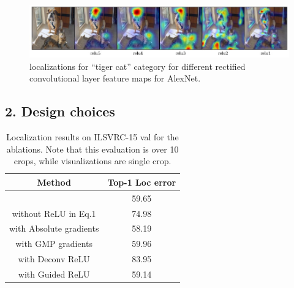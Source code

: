 \begin{figure}
 \centering
 \includegraphics[width=1\linewidth]{figures/alex_conv_layers_new.jpg}
 \caption{\gcam{} localizations for ``tiger cat'' category for different rectified convolutional layer feature maps for AlexNet.}
 \label{fig:alex_conv}
\end{figure}

\vspace{-5pt}
\subsection*{2. Design choices}

\vspace{-5pt}
\begin{table}[h!]
\centering
\captionsetup{belowskip=0pt,aboveskip=4pt}
    {
        \begin{tabular}{c@{\hskip 0.6in} c}\toprule
            \textbf{Method} & \textbf{Top-1 Loc error} \\
            \midrule

            \gcam{}                                                  & 59.65          \\
            \midrule
            \gcam{} without ReLU in Eq.1                             & 74.98          \\
            \gcam{} with Absolute gradients                          & 58.19          \\
            \gcam{} with GMP gradients                               & 59.96          \\
            \gcam{} with Deconv ReLU                                 & 83.95          \\
            \gcam{} with Guided ReLU                                 & 59.14          \\
            \bottomrule
        \end{tabular}

    }


    \caption{Localization results on ILSVRC-15 val for the ablations. Note that
    this evaluation is over 10 crops, while visualizations are single crop.}

    \label{table:locresablation}
\end{table}

